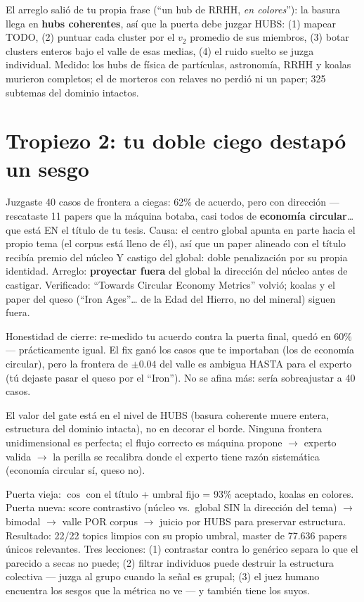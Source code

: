 \documentclass[11pt,a4paper]{article}
\begin{document}
El arreglo salió de tu propia frase (``un hub de RRHH, \emph{en colores}''): la basura
llega en \textbf{hubs coherentes}, así que la puerta debe juzgar HUBS: (1) mapear TODO,
(2) puntuar cada cluster por el $v_2$ promedio de sus miembros, (3) botar clusters
enteros bajo el valle de esas medias, (4) el ruido suelto se juzga individual. Medido:
los hubs de física de partículas, astronomía, RRHH y koalas murieron completos; el de
morteros con relaves no perdió ni un paper; 325 subtemas del dominio intactos.

\section{Tropiezo 2: tu doble ciego destapó un sesgo}

Juzgaste 40 casos de frontera a ciegas: 62\% de acuerdo, pero con dirección --- rescataste
11 papers que la máquina botaba, casi todos de \textbf{economía circular}\ldots{} que está
EN el título de tu tesis. Causa: el centro global apunta en parte hacia el propio tema
(el corpus está lleno de él), así que un paper alineado con el título recibía premio del
núcleo Y castigo del global: doble penalización por su propia identidad. Arreglo:
\textbf{proyectar fuera} del global la dirección del núcleo antes de castigar. Verificado:
``Towards Circular Economy Metrics'' volvió; koalas y el paper del queso (``Iron
Ages''\ldots{} de la Edad del Hierro, no del mineral) siguen fuera.

Honestidad de cierre: re-medido tu acuerdo contra la puerta final, quedó en 60\% ---
prácticamente igual. El fix ganó los casos que te importaban (los de economía circular),
pero la frontera de $\pm0.04$ del valle es ambigua HASTA para el experto (tú dejaste
pasar el queso por el ``Iron''). No se afina más: sería sobreajustar a 40 casos.

\begin{ojo}
El valor del gate está en el nivel de HUBS (basura coherente muere entera, estructura
del dominio intacta), no en decorar el borde. Ninguna frontera unidimensional es
perfecta; el flujo correcto es máquina propone $\to$ experto valida $\to$ la perilla se
recalibra donde el experto tiene razón sistemática (economía circular sí, queso no).
\end{ojo}

\begin{resumen}
Puerta vieja: $\cos$ con el título + umbral fijo = 93\% aceptado, koalas en colores.
Puerta nueva: score contrastivo (núcleo vs.\ global SIN la dirección del tema) $\to$
bimodal $\to$ valle POR corpus $\to$ juicio por HUBS para preservar estructura.
Resultado: 22/22 topics limpios con su propio umbral, master de 77.636 papers únicos
relevantes. Tres lecciones: (1) contrastar contra lo genérico separa lo que el parecido
a secas no puede; (2) filtrar individuos puede destruir la estructura colectiva ---
juzga al grupo cuando la señal es grupal; (3) el juez humano encuentra los sesgos que
la métrica no ve --- y también tiene los suyos.
\end{resumen}
\end{document}
